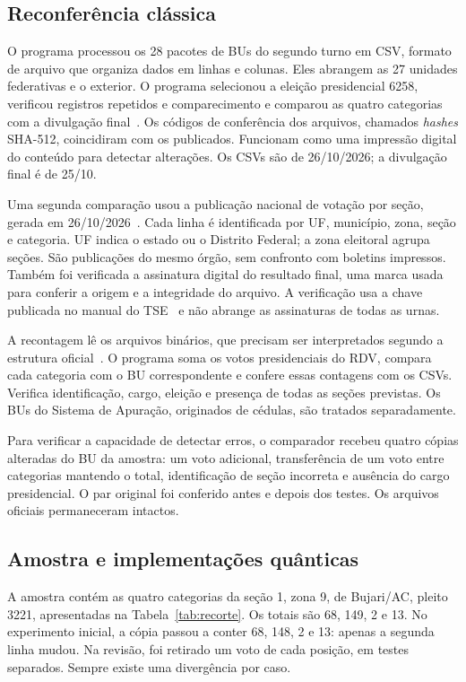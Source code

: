 \documentclass[conference]{IEEEtran}
\begin{document}
\subsection{Reconferência clássica}
O programa processou os 28 pacotes de BUs do segundo turno em CSV, formato de arquivo que organiza dados em linhas e colunas. Eles abrangem as 27 unidades federativas e o exterior. O programa selecionou a eleição presidencial 6258, verificou registros repetidos e comparecimento e comparou as quatro categorias com a divulgação final~\cite{tseBu2026,tseResultado2026}. Os códigos de conferência dos arquivos, chamados \textit{hashes} SHA-512, coincidiram com os publicados. Funcionam como uma impressão digital do conteúdo para detectar alterações. Os CSVs são de 26/10/2026; a divulgação final é de 25/10.

Uma segunda comparação usou a publicação nacional de votação por seção, gerada em 26/10/2026~\cite{tseVotacaoSecao2026}. Cada linha é identificada por UF, município, zona, seção e categoria. UF indica o estado ou o Distrito Federal; a zona eleitoral agrupa seções. São publicações do mesmo órgão, sem confronto com boletins impressos. Também foi verificada a assinatura digital do resultado final, uma marca usada para conferir a origem e a integridade do arquivo. A verificação usa a chave publicada no manual do TSE~\cite{tseManualJws2026} e não abrange as assinaturas de todas as urnas.

A recontagem lê os arquivos binários, que precisam ser interpretados segundo a estrutura oficial~\cite{tseDados2026,tseFormato2026}. O programa soma os votos presidenciais do RDV, compara cada categoria com o BU correspondente e confere essas contagens com os CSVs. Verifica identificação, cargo, eleição e presença de todas as seções previstas. Os BUs do Sistema de Apuração, originados de cédulas, são tratados separadamente.

Para verificar a capacidade de detectar erros, o comparador recebeu quatro cópias alteradas do BU da amostra: um voto adicional, transferência de um voto entre categorias mantendo o total, identificação de seção incorreta e ausência do cargo presidencial. O par original foi conferido antes e depois dos testes. Os arquivos oficiais permaneceram intactos.

\subsection{Amostra e implementações quânticas}
A amostra contém as quatro categorias da seção 1, zona 9, de Bujari/AC, pleito 3221, apresentadas na Tabela~\ref{tab:recorte}. Os totais são 68, 149, 2 e 13. No experimento inicial, a cópia passou a conter 68, 148, 2 e 13: apenas a segunda linha mudou. Na revisão, foi retirado um voto de cada posição, em testes separados. Sempre existe uma divergência por caso.
\end{document}
